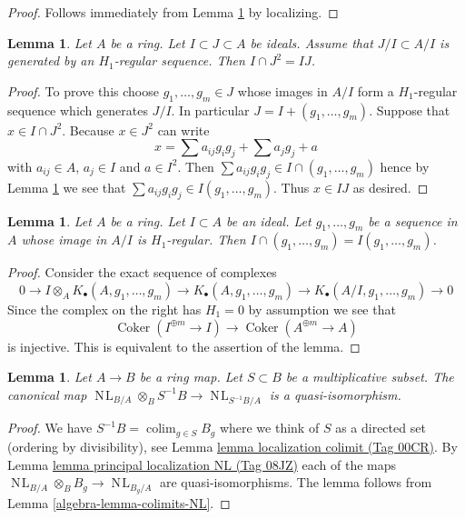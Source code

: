 \documentclass{amsart}
\theoremstyle{plain}
\newtheorem{lemma}[subsection]{Lemma}
\theoremstyle{definition}
\theoremstyle{remark}
\numberwithin{equation}{subsection}
\def\colim{\mathop{\mathrm{colim}}\nolimits}
\def\NL{\mathop{N\!L}\nolimits}
\def\Coker{\mathop{\mathrm{Coker}}}
\begin{document}
\begin{proof}
Follows immediately from Lemma \ref{lemma-conormal-sequence-H1-regular}
by localizing.
\end{proof}


\begin{lemma}
\label{lemma-conormal-sequence-H1-regular}
Let $A$ be a ring. Let $I \subset J \subset A$ be ideals.
Assume that $J/I \subset A/I$ is generated by an $H_1$-regular sequence.
Then $I \cap J^2 = IJ$.
\end{lemma}

\begin{proof}
To prove this choose $g_1, \ldots, g_m \in J$
whose images in $A/I$ form a $H_1$-regular sequence which generates $J/I$.
In particular $J = I + (g_1, \ldots, g_m)$.
Suppose that $x \in I \cap J^2$. Because $x \in J^2$ can write
$$
x =
\sum a_{ij} g_ig_j +
\sum a_j g_j +
a
$$
with $a_{ij} \in A$, $a_j \in I$ and $a \in I^2$.
Then $\sum a_{ij}g_ig_j \in I \cap (g_1, \ldots, g_m)$
hence by
Lemma \ref{lemma-H1-regular-in-quotient}
we see that $\sum a_{ij}g_ig_j \in I(g_1, \ldots, g_m)$.
Thus $x \in IJ$ as desired.
\end{proof}


\begin{lemma}
\label{lemma-H1-regular-in-quotient}
Let $A$ be a ring. Let $I \subset A$ be an ideal.
Let $g_1, \ldots, g_m$ be a sequence in $A$ whose image in
$A/I$ is $H_1$-regular. Then $I \cap (g_1, \ldots, g_m) =
I(g_1, \ldots, g_m)$.
\end{lemma}

\begin{proof}
Consider the exact sequence of complexes
$$
0 \to I \otimes_A K_\bullet(A, g_1, \ldots, g_m)
\to K_\bullet(A, g_1, \ldots, g_m) \to
K_\bullet(A/I, g_1, \ldots, g_m) \to 0
$$
Since the complex on the right has $H_1 = 0$ by assumption we
see that
$$
\Coker(I^{\oplus m} \to I)
\longrightarrow
\Coker(A^{\oplus m} \to A)
$$
is injective. This is equivalent to the assertion of the lemma.
\end{proof}


\begin{lemma}
\label{algebra-lemma-localize-NL}
Let $A \to B$ be a ring map. Let $S \subset B$ be a multiplicative subset.
The canonical map $\NL_{B/A} \otimes_B S^{-1}B \to \NL_{S^{-1}B/A}$
is a quasi-isomorphism.
\end{lemma}

\begin{proof}
We have $S^{-1}B = \colim_{g \in S} B_g$ where we think of $S$
as a directed set (ordering by divisibility), see
Lemma \href{https://stacks.math.columbia.edu/tag/00CR}{lemma localization colimit (Tag 00CR)}.
By Lemma \href{https://stacks.math.columbia.edu/tag/08JZ}{lemma principal localization NL (Tag 08JZ)} each of the maps
$\NL_{B/A} \otimes_B B_g \to \NL_{B_g/A}$
are quasi-isomorphisms.
The lemma follows from Lemma \ref{algebra-lemma-colimits-NL}.
\end{proof}
\end{document}

